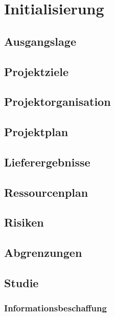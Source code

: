 \chapter{Initialisierung}

\label{ReportInitialisierung}

\section{Ausgangslage}

\section{Projektziele}



\section{Projektorganisation}

\section{Projektplan}

\section{Lieferergebnisse}

\section{Ressourcenplan}

\section{Risiken}

\section{Abgrenzungen}

\section{Studie}

\subsection{Informationsbeschaffung}

